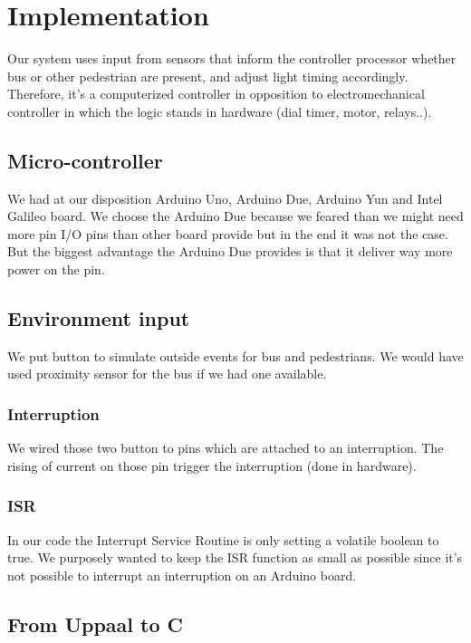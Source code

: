 \section{Implementation}

Our system uses input from sensors that inform the controller processor whether bus or other pedestrian are present, and adjust light timing accordingly. Therefore, it's a computerized controller in opposition to electromechanical controller in which the logic stands in hardware (dial timer, motor, relays..).

\subsection{Micro-controller}

We had at our disposition Arduino Uno, Arduino Due, Arduino Yun and Intel Galileo board. We choose the Arduino Due because we feared than we might need more pin I/O pins than other board provide but in the end it was not the case.	But the biggest advantage the Arduino Due provides is that it deliver way more power on the pin.

\subsection{Environment input}

We put button to simulate outside events for bus and pedestrians. We would have used proximity sensor for the bus if we had one available.

\subsubsection{Interruption}

We wired those two button to pins which are attached to an interruption. The rising of current on those pin trigger the interruption (done in hardware).

\subsubsection{ISR}

In our code the Interrupt Service Routine is only setting a volatile boolean to true. We purposely wanted to keep the ISR function as small as possible since it's not possible to interrupt an interruption on an Arduino board.


\subsection{From Uppaal to C}

